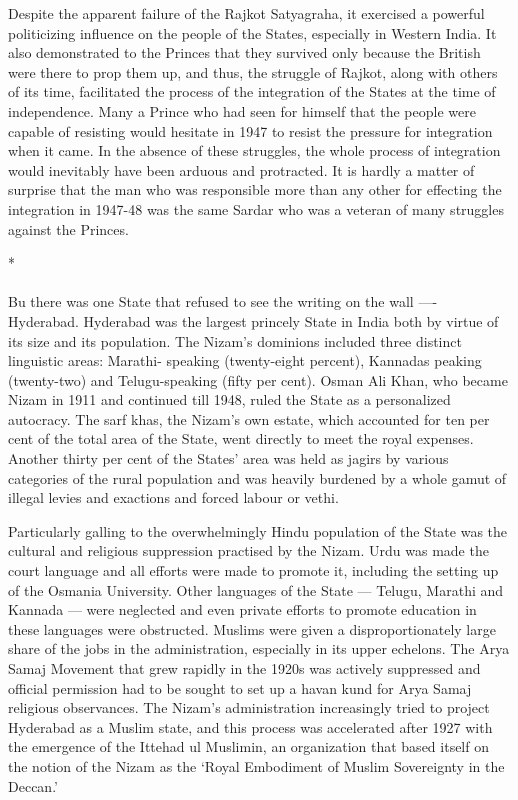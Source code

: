 Despite the apparent failure of the Rajkot Satyagraha, it exercised a powerful politicizing influence on the people of the States, especially in Western India. It also demonstrated to the Princes that they survived only because the British were there to prop them up, and thus, the struggle of Rajkot, along with others of its time, facilitated the process of the integration of the States at the time of independence. Many a Prince who had seen for himself that the people were capable of resisting would hesitate in 1947 to resist the pressure for integration when it came. In the absence of these struggles, the whole process of integration would inevitably have been arduous and protracted. It is hardly a matter of surprise that the man who was responsible more than any other for effecting the integration in 1947-48 was the same Sardar who was a veteran of many struggles against the Princes.

\begin{center}*\end{center}

\paragraph*{}
Bu there was one State that refused to see the writing on the wall —- Hyderabad. Hyderabad was the largest princely State in India both by virtue of its size and its population. The Nizam's dominions included three distinct linguistic areas: Marathi- speaking (twenty-eight percent), Kannadas peaking (twenty-two) and Telugu-speaking (fifty per cent). Osman Ali Khan, who became Nizam in 1911 and continued till 1948, ruled the State as a personalized autocracy. The sarf khas, the Nizam's own estate, which accounted for ten per cent of the total area of the State, went directly to meet the royal expenses. Another thirty per cent of the States' area was held as jagirs by various categories of the rural population and was heavily burdened by a whole gamut of illegal levies and exactions and forced labour or vethi. 

Particularly galling to the overwhelmingly Hindu population of the State was the cultural and religious suppression practised by the Nizam. Urdu was made the court language and all efforts were made to promote it, including the setting up of the Osmania University. Other languages of the State — Telugu, Marathi and Kannada — were neglected and even private efforts to promote education in these languages were obstructed. Muslims were given a disproportionately large share of the jobs in the administration, especially in its upper echelons. The Arya Samaj Movement that grew rapidly in the 1920s was actively suppressed and official permission had to be sought to set up a havan kund for Arya Samaj religious observances. The Nizam's administration increasingly tried to project Hyderabad as a Muslim state, and this process was accelerated after 1927 with the emergence of the Ittehad ul Muslimin, an organization that based itself on the notion of the Nizam as the `Royal Embodiment of Muslim Sovereignty in the Deccan.' 

